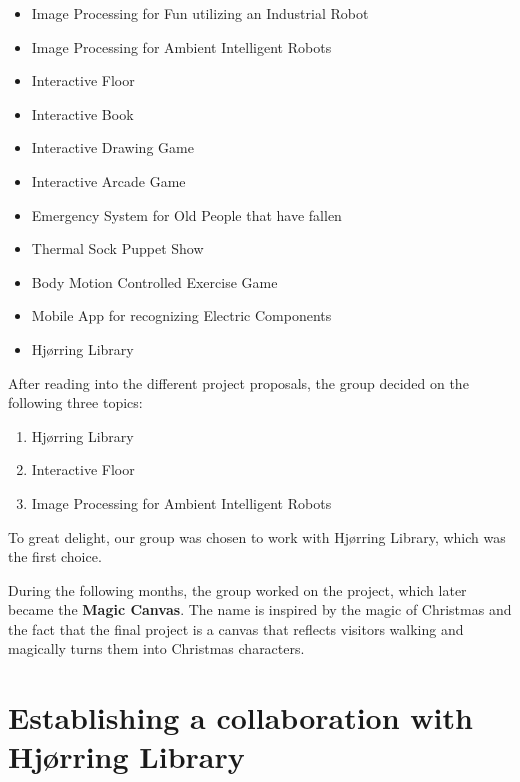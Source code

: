 \begin{itemize}
\item Image Processing for Fun utilizing an Industrial Robot
\item Image Processing for Ambient Intelligent Robots
\item Interactive Floor
\item Interactive Book
\item Interactive Drawing Game
\item Interactive Arcade Game
\item Emergency System for Old People that have fallen
\item Thermal Sock Puppet Show
\item Body Motion Controlled Exercise Game
\item Mobile App for recognizing Electric Components
\item Hj{\o}rring Library
\end{itemize}

After reading into the different project proposals, the group decided on the following three topics:

\begin{enumerate} 
\item Hj{\o}rring Library 
\item Interactive Floor 
\item Image Processing for Ambient Intelligent Robots 
\end{enumerate}

To great delight, our group was chosen to work with Hj{\o}rring Library, which was the first choice.

During the following months, the group worked on the project, which later became the \textbf{Magic Canvas}. The name is inspired by the magic of Christmas and the fact that the final project is a canvas that reflects visitors walking and magically turns them into Christmas characters.

\section{Establishing a collaboration with Hj{\o}rring Library}\label{sec:collab}


